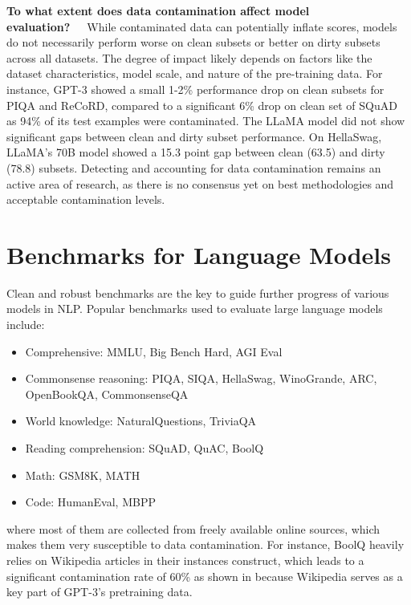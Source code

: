 \documentclass[letterpaper]{article} %
\begin{document}
\noindent\textbf{To what extent does data contamination affect model evaluation?}~~~While contaminated data can potentially inflate scores, models do not necessarily perform worse on clean subsets or better on dirty subsets across all datasets. The degree of impact likely depends on factors like the dataset characteristics, model scale, and nature of the pre-training data. For instance, GPT-3 \cite{brown2020language} showed a small 1-2\% performance drop on clean subsets for PIQA and ReCoRD, compared to a significant 6\% drop on clean set of SQuAD as 94\% of its test examples were contaminated. The LLaMA model \cite{touvron2023llama} did not show significant gaps between clean and dirty subset performance. On HellaSwag, LLaMA's 70B model showed a 15.3 point gap between clean (63.5) and dirty (78.8) subsets. Detecting and accounting for data contamination remains an active area of research, as there is no consensus yet on best methodologies and acceptable contamination levels.

\section{Benchmarks for Language Models}

Clean and robust benchmarks are the key to guide further progress of various models in NLP. 
Popular benchmarks used to evaluate large language models include:
\begin{itemize}
    \item Comprehensive: MMLU, Big Bench Hard, AGI Eval
    \item Commonsense reasoning: PIQA, SIQA, HellaSwag, WinoGrande, ARC, OpenBookQA, CommonsenseQA
    \item World knowledge: NaturalQuestions, TriviaQA
    \item Reading comprehension: SQuAD, QuAC, BoolQ
    \item Math: GSM8K, MATH
    \item Code: HumanEval, MBPP
\end{itemize}
where most of them are collected from freely available online sources, which makes them very susceptible to data contamination. For instance, BoolQ \cite{clark2019boolq} heavily relies on Wikipedia articles in their instances construct, which leads to a significant contamination rate of 60\% as shown in \cite{brown2020language} because Wikipedia serves as a key part of GPT-3's pretraining data.
\end{document}
